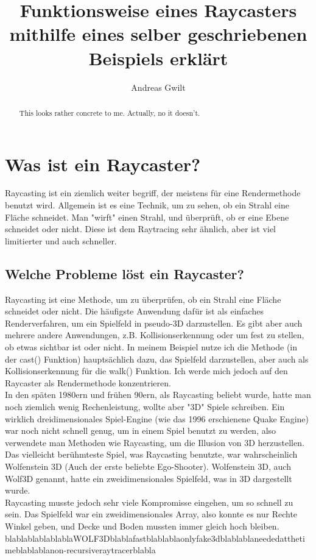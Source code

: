 \documentclass[a4paper,11pt]{report}
\title{Funktionsweise eines Raycasters mithilfe eines selber geschriebenen Beispiels erkl\"art}
\author{Andreas Gwilt}
\begin{document}
\maketitle
\tableofcontents

\begin{abstract}
This looks rather concrete to me. Actually, no it doesn't.
\end{abstract}

\section{Was ist ein Raycaster?}
Raycasting ist ein ziemlich weiter begriff, der meistens für eine Rendermethode benutzt wird. Allgemein ist es eine Technik, um zu sehen, ob ein Strahl eine Fläche schneidet. Man "wirft" einen Strahl, und überprüft, ob er eine Ebene schneidet oder nicht. Diese ist dem Raytracing sehr ähnlich, aber ist viel limitierter und auch schneller.

\subsection{Welche Probleme löst ein Raycaster?}
Raycasting ist eine Methode, um zu überprüfen, ob ein Strahl eine Fläche schneidet oder nicht. Die häufigste Anwendung dafür ist als einfaches Renderverfahren, um ein Spielfeld in pseudo-3D darzustellen. Es gibt aber auch mehrere andere Anwendungen, z.B. Kollisionserkennung oder um fest zu stellen, ob etwas sichtbar ist oder nicht. In meinem Beispiel nutze ich die Methode (in der cast() Funktion) hauptsächlich dazu, das Spielfeld darzustellen, aber auch als Kollisionserkennung für die walk() Funktion. Ich werde mich jedoch auf den Raycaster als Rendermethode konzentrieren.\\
In den späten 1980ern und frühen 90ern, als Raycasting beliebt wurde, hatte man noch ziemlich wenig Rechenleistung, wollte aber "3D" Spiele schreiben. Ein wirklich dreidimensionales Spiel-Engine (wie das 1996 erschienene Quake Engine) war noch nicht schnell genug, um in einem Spiel benutzt zu werden, also verwendete man Methoden wie Raycasting, um die Illusion von 3D herzustellen. Das vielleicht berühmteste Spiel, was Raycasting benutzte, war wahrscheinlich Wolfenstein 3D (Auch der erste beliebte Ego-Shooter). Wolfenstein 3D, auch Wolf3D genannt, hatte ein zweidimensionales Spielfeld, was in 3D dargestellt wurde. \\
Raycasting musste jedoch sehr viele Kompromisse eingehen, um so schnell zu sein. Das Spielfeld war ein zweidimensionales Array, also konnte es nur Rechte Winkel geben, und Decke und Boden mussten immer gleich hoch bleiben. 
blablablablablablaWOLF3Dblablafastblablablaonlyfake3dblablablaneededatthetimeblablablanon-recursiveraytracerblabla
\end{document}
